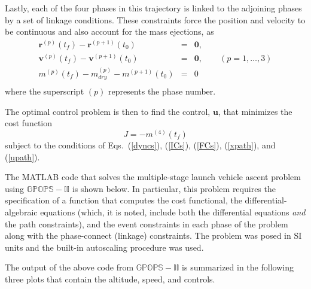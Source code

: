 \documentclass[10pt]{article}
\newenvironment{shadedframe}{%
  \def\FrameCommand{\fcolorbox{black}{shadecolor}}%
  \MakeFramed {\FrameRestore}}
{\endMakeFramed}
\begin{document}
Lastly, each of the four phases in this trajectory is linked to the
adjoining phases by a set of linkage conditions.  These constraints
force the position and velocity to be continuous and also account for
the mass ejections, as 
\begin{equation}
\begin{array}{rcl}
\mathbf{r}^{(p)}(t_f)-\mathbf{r}^{(p+1)}(t_0) &=& \mathbf{0}, \\
\mathbf{v}^{(p)}(t_f)-\mathbf{v}^{(p+1)}(t_0) &=& \mathbf{0}, \qquad (p=1,\ldots,3)\\
m^{(p)}(t_f)-m_{dry}^{(p)}-m^{(p+1)}(t_0) &=& 0 \\
\end{array}
\end{equation}
where the superscript $(p)$ represents the phase number.

The optimal control problem is then to find the control, $\mathbf{u}$,
that minimizes the cost function
\begin{equation}
  J=-m^{(4)}(t_f)
\end{equation}
subject to the conditions of Eqs.~(\ref{dyncs}), (\ref{ICs}), (\ref{FCs}),
(\ref{xpath}), and (\ref{upath}).

The MATLAB code that solves the multiple-stage launch vehicle ascent
problem using $\mathbb{GPOPS-II}$ is shown below.  In particular, this
problem requires the specification of a function that computes the
cost functional, the differential-algebraic equations (which, it is
noted, include both the differential equations {\em and} the path
constraints), and the event constraints in each phase of the problem
along with the phase-connect (\ie linkage) constraints.  The problem
was posed in SI units and the built-in autoscaling procedure was
used.
\begin{shadedframe}






\end{shadedframe}  
The output of the above code from $\mathbb{GPOPS-II}$ is summarized in
the following three plots that contain the altitude, speed, and
controls.
\end{document}

